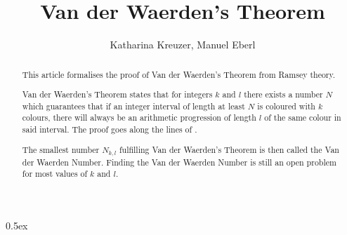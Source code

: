 \documentclass[11pt,a4paper]{article}
\begin{document}
\title{Van der Waerden's Theorem}
\author{Katharina Kreuzer, Manuel Eberl}
\maketitle

\begin{abstract}
This article formalises the proof of Van der Waerden's Theorem from Ramsey theory. 

Van der Waerden's Theorem states that for integers $k$ and $l$ there exists a number $N$ which guarantees that if an integer interval of length at least $N$ is coloured with $k$ colours, there will always be an arithmetic progression of length $l$ of the same colour in said interval. 
The proof goes along the lines of \cite{Swan}.

The smallest number $N_{k,l}$ fulfilling Van der Waerden's Theorem is then called the Van der Waerden Number. Finding the Van der Waerden Number is still an open problem for most values of $k$ and $l$.
\end{abstract}


\newpage
\tableofcontents

\newpage
\parindent 0pt\parskip 0.5ex



\nocite{Swan}



\end{document}
